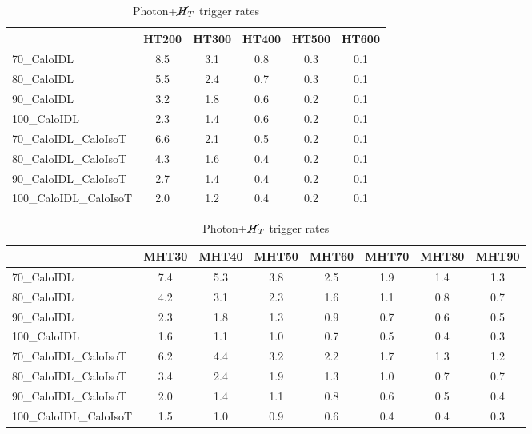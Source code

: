 \begin{table}
\begin{table}
\begin{center}
\begin{tabular}{|l|ccccc|}\hline
         & HT200 & HT300 & HT400 & HT500 & HT600 \\ \hline \hline
70\_CaloIDL & 8.5 & 3.1 & 0.8 & 0.3 & 0.1 \\
80\_CaloIDL & 5.5 & 2.4 & 0.7 & 0.3 & 0.1 \\
90\_CaloIDL & 3.2 & 1.8 & 0.6 & 0.2 & 0.1 \\
100\_CaloIDL & 2.3 & 1.4 & 0.6 & 0.2 & 0.1 \\ \hline
70\_CaloIDL\_CaloIsoT & 6.6 & 2.1 & 0.5 & 0.2 & 0.1 \\
80\_CaloIDL\_CaloIsoT & 4.3 & 1.6 & 0.4 & 0.2 & 0.1 \\
90\_CaloIDL\_CaloIsoT & 2.7 & 1.4 & 0.4 & 0.2 & 0.1 \\
100\_CaloIDL\_CaloIsoT & 2.0 & 1.2 & 0.4 & 0.2 & 0.1 \\ \hline
\end{tabular}
\end{center}
\caption{Photon+$H_T$ trigger rates}
\end{table}


\begin{table}
\begin{center}
\begin{tabular}{|l|ccccccc|}\hline
         & MHT30 & MHT40 & MHT50 & MHT60 & MHT70 & MHT80 & MHT90 \\ \hline \hline
70\_CaloIDL & 7.4 & 5.3 & 3.8 & 2.5 & 1.9 & 1.4 & 1.3  \\
80\_CaloIDL & 4.2 & 3.1 & 2.3 & 1.6 & 1.1 & 0.8 & 0.7 \\
90\_CaloIDL & 2.3 & 1.8 & 1.3 & 0.9 & 0.7 & 0.6 & 0.5 \\
100\_CaloIDL & 1.6 & 1.1 & 1.0 & 0.7 & 0.5 & 0.4 & 0.3 \\ \hline
70\_CaloIDL\_CaloIsoT & 6.2 & 4.4 & 3.2 & 2.2 & 1.7 & 1.3 & 1.2 \\
80\_CaloIDL\_CaloIsoT & 3.4 & 2.4 & 1.9 & 1.3 & 1.0 & 0.7 & 0.7 \\
90\_CaloIDL\_CaloIsoT & 2.0 & 1.4 & 1.1 & 0.8 & 0.6 & 0.5 & 0.4 \\
100\_CaloIDL\_CaloIsoT & 1.5 & 1.0 & 0.9 & 0.6 & 0.4 & 0.4 & 0.3 \\ \hline
\end{tabular}
\end{center}
\caption{Photon+$\cancel{H}_T$ trigger rates}
\end{table}



\end{table}

